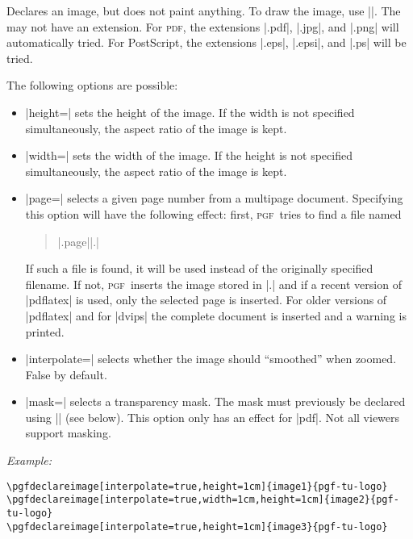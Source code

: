 \documentclass{ltxdoc}
\def\pgf{\textsc{pgf}}
\def\declare#1{{\color{red!75!black}#1}}
\def\example{\par\smallskip\noindent\textit{Example: }}
\newcommand\opt[1]{{\color{black!50!green}#1}}
\renewcommand\oarg[1]{\opt{{\ttfamily[}\meta{#1}{\ttfamily]}}}
\begin{document}
\begin{command}{\pgfdeclareimage\oarg{options}}
  Declares an image, but does not paint anything. To draw the image,
  use ||. The  may not
  have an extension.  For \textsc{pdf}, the extensions |.pdf|, |.jpg|,
  and |.png| will automatically tried. For PostScript, the extensions
  |.eps|, |.epsi|, and |.ps| will be tried. 

  The following options are possible:
  \begin{itemize}
  \item
    \declare{|height=|} sets the height of the
    image. If the width is not specified simultaneously, the aspect
    ratio of the image is kept.
  \item
    \declare{|width=|} sets the width of the
    image. If the height is not specified simultaneously, the aspect
    ratio of the image is kept.
  \item
    \declare{|page=|} selects a given page number
    from a multipage document. Specifying this option will have the
    following effect: first, \pgf\ tries to find a file named
    \begin{quote}
      |.page||.|
    \end{quote}
    If such a file is found, it will be used instead of the originally
    specified filename. If not, \pgf\ inserts the image stored in
    |.| and if a recent version of
    |pdflatex| is used, only the selected page is inserted. For older
    versions of |pdflatex| and for |dvips| the complete document is
    inserted and a warning is printed.    
  \item
    \declare{|interpolate=|} selects whether the
    image should ``smoothed'' when zoomed. False by default.
  \item
    \declare{|mask=|} selects a transparency mask. The
    mask must previously be declared using |\pgfdeclaremask| (see
    below). This option only has an effect for |pdf|. Not all viewers
    support masking. 
  \end{itemize}
 \example
\begin{verbatim}
\pgfdeclareimage[interpolate=true,height=1cm]{image1}{pgf-tu-logo}
\pgfdeclareimage[interpolate=true,width=1cm,height=1cm]{image2}{pgf-tu-logo}
\pgfdeclareimage[interpolate=true,height=1cm]{image3}{pgf-tu-logo}
\end{verbatim}
\end{command}
\end{document}
